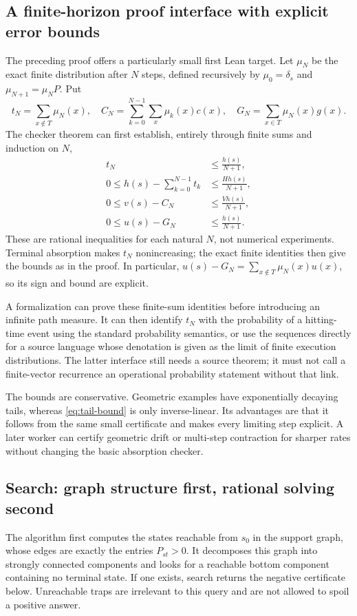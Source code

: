 \subsection{A finite-horizon proof interface with explicit error bounds}
The preceding proof offers a particularly small first Lean target. Let
$\mu_N$ be the exact finite distribution after $N$ steps, defined recursively
by $\mu_0=\delta_s$ and $\mu_{N+1}=\mu_NP$. Put
\[
 t_N=\sum_{x\notin T}\mu_N(x),\quad
 C_N=\sum_{k=0}^{N-1}\sum_x\mu_k(x)c(x),\quad
 G_N=\sum_{x\in T}\mu_N(x)g(x).
\]
The checker theorem can first establish, entirely through finite sums and
induction on $N$,
\begin{align}
 t_N&\leq\frac{h(s)}{N+1},\label{eq:tail-bound}\\
 0\leq h(s)-\sum_{k=0}^{N-1}t_k
       &\leq\frac{Hh(s)}{N+1},\label{eq:time-bound}\\
 0\leq v(s)-C_N&\leq\frac{Vh(s)}{N+1},\label{eq:cost-bound}\\
 0\leq u(s)-G_N&\leq\frac{h(s)}{N+1}.\label{eq:payoff-bound}
\end{align}
These are rational inequalities for each natural $N$, not numerical
experiments. Terminal absorption makes $t_N$ nonincreasing; the exact finite
identities then give the bounds as in the proof. In particular,
$u(s)-G_N=\sum_{x\notin T}\mu_N(x)u(x)$, so its sign and bound are explicit.

A formalization can prove these finite-sum identities before introducing an
infinite path measure. It can then identify $t_N$ with the probability of a
hitting-time event using the standard probability semantics, or use the
sequences directly for a source language whose denotation is given as the
limit of finite execution distributions. The latter interface still needs a
source theorem; it must not call a finite-vector recurrence an operational
probability statement without that link.

The bounds are conservative. Geometric examples have exponentially decaying
tails, whereas \eqref{eq:tail-bound} is only inverse-linear. Its advantages are
that it follows from the same small certificate and makes every limiting step
explicit. A later worker can certify geometric drift or multi-step
contraction for sharper rates without changing the basic absorption checker.

\subsection{Search: graph structure first, rational solving second}
The algorithm first computes the states reachable from $s_0$ in the support
graph, whose edges are exactly the entries $P_{st}>0$. It decomposes this graph
into strongly connected components and looks for a reachable bottom component
containing no terminal state. If one exists, search returns the negative
certificate below. Unreachable traps are irrelevant to this query and are not
allowed to spoil a positive answer.

